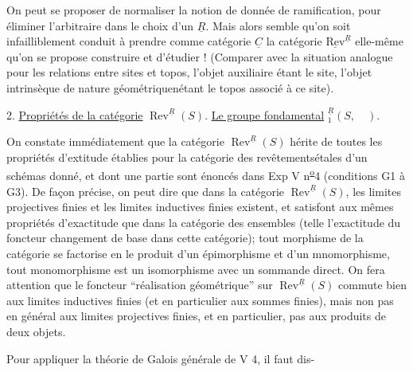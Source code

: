 On peut se proposer de normaliser la notion de donnée de ramification, pour éliminer l'arbitraire dans le choix d'un $\underline{R}$. Mais alors  semble qu'on soit infailliblement conduit à prendre comme catégorie $\underline{C}$ la catégorie $\underline{\mathrm{Rev}}^{\underline{R}}$ elle-même qu'on se propose  construire et d'étudier ! (Comparer avec la situation analogue pour les relations entre sites et topos, l'objet auxiliaire étant le site, l'objet intrinsèque de nature géométriquenétant le topos associé à ce site).

2. \uline{Propriétés de la catégorie} $\operatorname{Rev}^{\underline{R}}(S)$. \uline{Le groupe fondamental} $ {}^{\underline{R}}_1(S,\quad)$.

On constate immédiatement que la catégorie $\operatorname{Rev}^{\underline{R}}(S)$ hérite de toutes les propriétés d'extitude  établies pour la catégorie des revêtementsétales d'un schémas donné, et dont une partie sont énoncés dans Exp V n\textsuperscript{\uline{o}}4 (conditions G1 à G3). De façon précise, on peut dire que dans la catégorie $\operatorname{Rev}^{\underline{R}}(S)$, les limites projectives finies et les limites inductives finies existent, et satisfont aux mêmes propriétés d'exactitude que dans la catégorie des ensembles (telle l'exactitude du foncteur changement de base dans cette catégorie);   tout morphisme de la catégorie se factorise en le produit d'un épimorphisme et d'un mnomorphisme,  tout monomorphisme est un isomorphisme avec un sommande direct. On fera attention que le foncteur ``réalisation géométrique'' sur $\operatorname{Rev}^{\underline{R}}(S)$ commute bien aux limites inductives finies (et  en particulier aux sommes finies), mais non pas en général aux limites projectives finies, et en particulier, pas aux produits de deux objets.

Pour appliquer la théorie de Galois générale de V 4, il faut dis-

